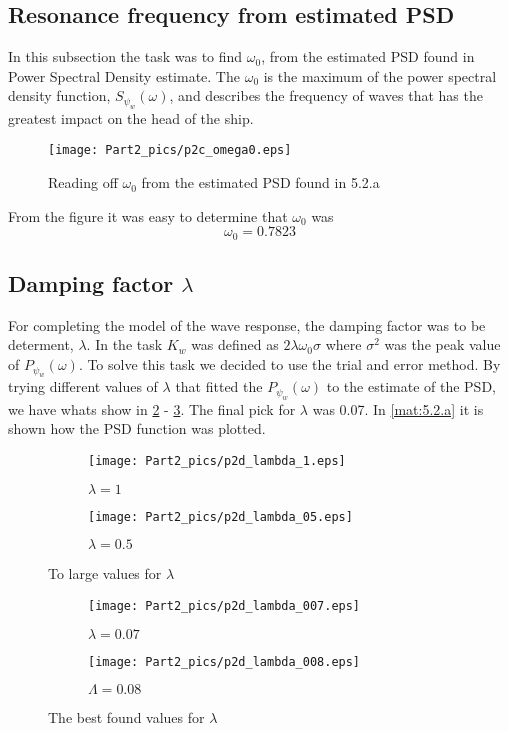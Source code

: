 \subsection{Resonance frequency from estimated PSD} \label{sec:5.2.c}
In this subsection the task was to find $\omega_0$, from the estimated PSD found in Power Spectral Density estimate.
\newline
\newline
The $\omega_0$ is the maximum of the power spectral density function, $S_{\psi_w}(\omega)$, and describes the frequency of waves that has the greatest impact on the head of the ship. 
\begin{figure}[H]
    \centering
    \texttt{[image: Part2\_pics/p2c\_omega0.eps]}
    \caption{Reading off $\omega_0$ from the estimated PSD found in 5.2.a}
    \label{fig:p2c}
\end{figure}
From the figure it was easy to determine that $\omega_0$ was
\begin{equation}
    \omega_0 = 0.7823
\end{equation}



\subsection{Damping factor $\lambda$} \label{sec:5.2.d}
For completing the model of the wave response, the damping factor was to be determent, $\lambda$. In the task $K_w$ was defined as $2 \lambda \omega_0 \sigma$ where $\sigma^2$ was the peak value of $P_{\psi_w}(\omega)$. To solve this task we decided to use the trial and error method. By trying different values of $\lambda$ that fitted the $P_{\psi_w}(\omega)$ to the estimate of the PSD, we have whats show in \cref{fig:p2d1} - \ref{fig:p2d2}. The final pick for $\lambda$ was 0.07. In \cref{mat:5.2.a} it is shown how the PSD function was plotted. 

\begin{figure}[H]
\begin{subfigure}{0.5\textwidth}
    \texttt{[image: Part2\_pics/p2d\_lambda\_1.eps]}
    \caption{$\lambda = 1$}
\end{subfigure}
\begin{subfigure}{0.5\textwidth}
    \texttt{[image: Part2\_pics/p2d\_lambda\_05.eps]}
    \caption{$\lambda = 0.5$}
\end{subfigure}
\caption{To large values for $\lambda$}
\label{fig:p2d1}
\end{figure}

\begin{figure}[H]
\begin{subfigure}{0.5\textwidth}
    \texttt{[image: Part2\_pics/p2d\_lambda\_007.eps]}
    \caption{$\lambda = 0.07$}
\end{subfigure}
\begin{subfigure}{0.5\textwidth}
    \texttt{[image: Part2\_pics/p2d\_lambda\_008.eps]}
    \caption{$\Lambda = 0.08$}
\end{subfigure}
\caption{The best found values for $\lambda$}
\label{fig:p2d2}
\end{figure}
